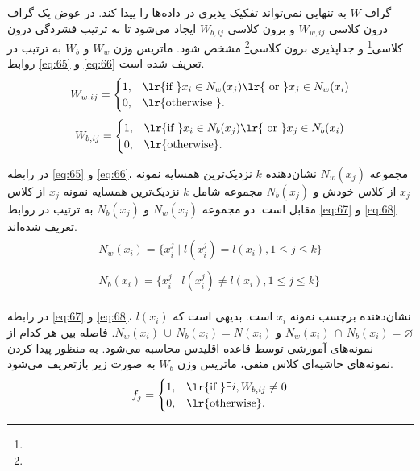گراف $W$ به تنهایی نمی‌تواند تفکیک پذیری در داده‌ها را پیدا کند. در عوض یک گراف درون کلاسی  $W_{w,ij}$ و برون کلاسی   $W_{b,ij}$ ایجاد می‌شود تا به ترتیب فشردگی درون کلاسی\footnote{}  و جداپذیری برون کلاسی\footnote{}  مشخص شود. ماتریس وزن $W_{w}$ و  $W_{b}$ به ترتیب در روابط \ref{eq:65} و \ref{eq:66} تعریف شده است.
\begin{equation}\label{eq:65}
W_{w,ij} =
\begin{cases}
1, & \textrm{\lr{if }} x_i \in N_w(x_j) \textrm{\lr{ or }} x_j \in N_w(x_i)  \\
0, & \textrm{\lr{otherwise }}.
\end{cases}
\end{equation}
\begin{equation}\label{eq:66}
W_{b,ij} =
\begin{cases}
1, & \textrm{\lr{if }} x_i \in N_b(x_j) \textrm{\lr{ or }} x_j \in N_b(x_i)  \\
0, & \textrm{\lr{otherwise}}.
\end{cases}
\end{equation}

در رابطه \ref{eq:65} و \ref{eq:66}، مجموعه $N_w(x_j)$ نشان‌دهنده $k$ نزدیک‌ترین همسایه نمونه $x_j$ از کلاس خودش و $N_b(x_j)$ مجموعه   شامل $k$ نزدیک‌ترین همسایه نمونه  $x_j$ از کلاس مقابل است. دو مجموعه $N_w(x_j)$ و $N_b(x_j)$ به ترتیب در روابط \ref{eq:67} و \ref{eq:68} تعریف شده‌اند.
\begin{align}
\label{eq:67}
\begin{split}
N_w\left(x_i\right) = \{x^j_i \mid l(x^j_i) = l(x_i), 1 \leq j \leq k \}
\end{split} \\
\label{eq:68}
\begin{split}
N_b\left(x_i\right) = \{x^j_i \mid l(x^j_i) \neq l(x_i), 1 \leq j \leq k \}
\end{split}
\end{align}

در رابطه \ref{eq:67} و \ref{eq:68}،  $l(x_i)$ نشان‌دهنده برچسب نمونه $x_i$ است. بدیهی است که  $N_w(x_i)\, \cap \, N_b(x_i) = \varnothing $ و  $N_w(x_i)\, \cup \, N_b(x_i) = N(x_i)$. فاصله بین هر کدام از نمونه‌های آموزشی توسط قاعده اقلیدس محاسبه می‌شود. به منظور پیدا کردن نمونه‌های حاشیه‌ای کلاس منفی، ماتریس وزن  $W_{b}$ به صورت زیر بازتعریف می‌شود.
\begin{equation}\label{eq:69}
f_{j} =
\begin{cases}
1, & \textrm{\lr{if }} \exists i, W_{b,ij} \neq 0  \\
0, & \textrm{\lr{otherwise}}.
\end{cases}
\end{equation}   


